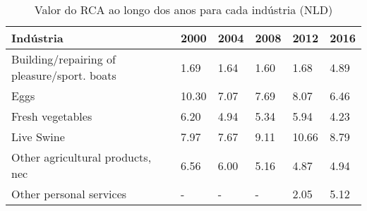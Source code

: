 \begin{table}
\centering
\caption{Valor do RCA ao longo dos anos para cada indústria (NLD)}
\begin{tabular}{p{6cm}p{1.5cm}p{1.5cm}p{1.5cm}p{1.5cm}p{1.5cm}}
\toprule
                                  Indústria &  2000 & 2004 & 2008 &  2012 & 2016 \\
\midrule
Building/repairing of pleasure/sport. boats &  1.69 & 1.64 & 1.60 &  1.68 & 4.89 \\
                                       Eggs & 10.30 & 7.07 & 7.69 &  8.07 & 6.46 \\
                           Fresh vegetables &  6.20 & 4.94 & 5.34 &  5.94 & 4.23 \\
                                 Live Swine &  7.97 & 7.67 & 9.11 & 10.66 & 8.79 \\
           Other agricultural products, nec &  6.56 & 6.00 & 5.16 &  4.87 & 4.94 \\
                    Other personal services &     - &    - &    - &  2.05 & 5.12 \\
\bottomrule
\end{tabular}
\end{table}
